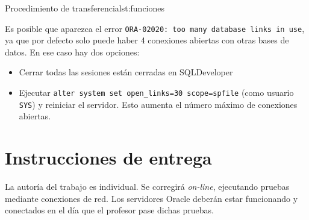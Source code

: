 \begin{homeworkProblem}
\begin{listadosql}{Procedimiento de transferencia}{lst:funciones}
\end{listadosql}


\begin{Aviso}[ORA-02020]
  Es posible que aparezca el error \texttt{ORA-02020: too many database links in use}, ya que por defecto solo puede haber 4 conexiones abiertas con otras bases de datos. En ese caso hay dos opciones:
  \begin{itemize}
  \item Cerrar todas las sesiones están cerradas en SQLDeveloper
  \item Ejecutar \texttt{alter system set open\_links=30 scope=spfile} (como usuario \texttt{SYS}) y reiniciar el servidor. Esto aumenta el número máximo de conexiones abiertas.
  \end{itemize}

\end{Aviso}

\end{homeworkProblem}


\section{Instrucciones de entrega}
La autoría del trabajo es individual. Se corregirá \textit{on-line}, ejecutando pruebas mediante conexiones de red. Los servidores Oracle deberán estar funcionando y conectados en el día que el profesor pase dichas pruebas.








